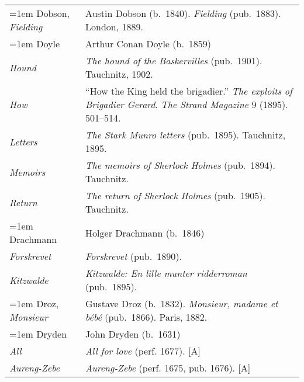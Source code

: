 \begin{xltabular}{\textwidth}{ lQ }
\hangindent=1em  Dobson, \textit{Fielding} & Austin Dobson (b.~1840). \textit{Fielding} (pub.~1883). London, 1889.  \\ %

\hangindent=1em  Doyle & Arthur Conan Doyle (b.~1859) \\
\hspace{1em}\textit{Hound} & \textit{The hound of the Baskervilles} (pub.~1901). Tauchnitz, 1902. \\
\hspace{1em}\textit{How} & ``How the King held the brigadier.'' \textit{The exploits of Brigadier Gerard}. \textit{The Strand Magazine} 9 (1895). 501--514. \\ %
\hspace{1em}\textit{Letters} & \textit{The Stark Munro letters} (pub.~1895). Tauchnitz, 1895.  \\
\hspace{1em}\textit{Memoirs} & \textit{The memoirs of Sherlock Holmes} (pub.~1894). Tauchnitz. \\ %
\hspace{1em}\textit{Return} & \textit{The return of Sherlock Holmes} (pub.~1905). Tauchnitz. \\ %

\hangindent=1em  Drachmann & Holger Drachmann (b.~1846) \\
\hspace{1em}\textit{Forskrevet} & \textit{Forskrevet} (pub.~1890). \\
\hspace{1em}\textit{Kitzwalde} & \textit{Kitzwalde: En lille munter ridderroman} (pub.~1895). \\

\hangindent=1em  Droz, \textit{Monsieur} & Gustave Droz (b.~1832). \textit{Monsieur, madame et bébé} (pub.~1866). Paris, 1882.\\

\hangindent=1em  Dryden & John Dryden (b.~1631) \\
\hspace{1em}\textit{All} & \textit{All for love} (perf. 1677). [A] \\
\hspace{1em}\textit{Aureng-Zebe} & \textit{Aureng-Zebe} (perf. 1675, pub. 1676). [A] \\


\end{xltabular}
